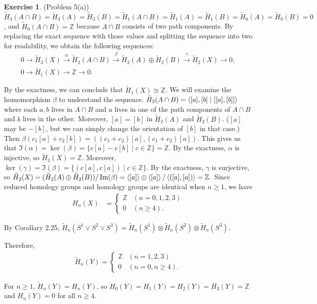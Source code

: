 \documentclass[12pt, psamsfonts]{amsart}
\theoremstyle{definition}
\newtheorem*{exer}{Exercise}
\theoremstyle{remark}
\numberwithin{equation}{section}
\begin{document}
\begin{exer}{(Problem 5(a))}
  $\tilde{H}_3(A \cap B) = \tilde{H}_3(A) = \tilde{H}_3(B) = \tilde{H}_1(A \cap B) = \tilde{H}_1(A) = \tilde{H}_1(B) = \tilde{H}_0(A) = \tilde{H}_0(B) = 0$, and $\tilde{H}_0(A \cap B) = \mathbb{Z}$ because $A \cap B$ consists of two path components.
  By replacing the exact sequence with those values and splitting the sequence into two for readability, we obtain the following sequences:
  \begin{gather*}
    0 \rightarrow \tilde{H}_3(X) \xrightarrow{\alpha} \tilde{H}_2(A \cap B) \xrightarrow{\beta} \tilde{H}_2(A) \oplus \tilde{H}_2(B) \xrightarrow{\gamma} \tilde{H}_2(X) \rightarrow 0, \\
    0 \rightarrow \tilde{H}_1(X) \rightarrow \mathbb{Z} \rightarrow 0.
  \end{gather*}

  By the exactness, we can conclude that $\tilde{H}_1(X) \cong \mathbb{Z}$.
  We will examine the homomorphism $\beta$ to understand the sequence.
  $\tilde{H}_2(A \cap B) = \ev{[a], [b] \mid [[a], [b]]}$ where each $a, b$ lives in $A \cap B$ and $a$ lives in one of the path components of $A \cap B$ and $b$ lives in the other.
  Moreover, $[a] = [b]$ in $\tilde{H}_2(A)$ and $\tilde{H}_2(B)$.
  ($[a]$ may be $-[b]$, but we can simply change the orientation of $[b]$ in that case.)
  Then $\beta(c_1[a] + c_2[b]) = ((c_1 + c_2)[a], (c_1 + c_2)[a])$.
  This gives us that $\Im(\alpha) = \ker(\beta) = \{ c[a] - c[b] \mid c \in \mathbb{Z} \} = \mathbb{Z}$.
  By the exactness, $\alpha$ is injective, so $\tilde{H}_3(X) = \mathbb{Z}$.
  Moreover, $\ker(\gamma) = \Im(\beta) = \{ (c[a], c[a]) \mid c \in \mathbb{Z} \}$.
  By the exactness, $\gamma$ is surjective, so $\tilde{H}_2(X) = (\tilde{H}_2(A) \oplus \tilde{H}_2(B)) / \Im(\beta) = \ev{[a]} \oplus \ev{[a]} / \ev{([a], [a])} = \mathbb{Z}$.
  Since reduced homology groups and homology groups are identical when $n \geq 1$, we have
  \begin{align*}
    H_n(X) &= \begin{cases}
      \mathbb{Z} & (n = 0, 1, 2, 3) \\
      0 & (n \geq 4).
    \end{cases}
  \end{align*}


  By Corollary 2.25, $\tilde{H}_n(S^1 \vee S^2 \vee S^3) = \tilde{H}_n(S^1) \otimes \tilde{H}_n(S^2) \otimes \tilde{H}_n(S^3)$.

  Therefore,
  \begin{align*}
    \tilde{H}_n(Y) = \begin{cases}
      \mathbb{Z} & (n = 1, 2, 3) \\
      0 & (n = 0, n \geq 4).
    \end{cases}
  \end{align*}

  For $n \geq 1$, $\tilde{H}_n(Y) = H_n(Y)$, so $H_0(Y) = H_1(Y) = H_2(Y) = H_3(Y) = \mathbb{Z}$ and $H_n(Y) = 0$ for all $n \geq 4$.
\end{exer}
\end{document}
